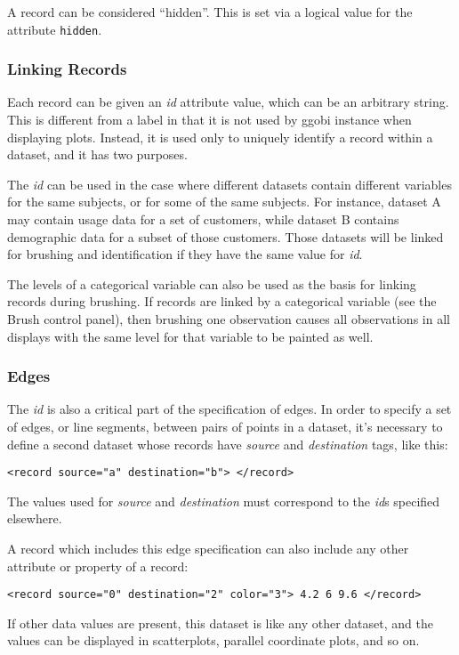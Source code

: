 \documentclass{article}
\def\XMLAttribute#1{\textsl{#1}}
\begin{document}
A record can be considered ``hidden''.  This is set via a logical
value for the attribute \texttt{hidden}.

\subsubsection{Linking Records}
\label{LinkingRecords}

Each record can be given an \XMLAttribute{id} attribute value, which
can be an arbitrary string.  This
is different from a label in that it is not used by ggobi instance
when displaying plots.  Instead, it is used only to uniquely identify
a record within a dataset, and it has two purposes.

The \XMLAttribute{id} can be used in the case where different
datasets contain different variables for the same subjects, or
for some of the same subjects.  For instance, dataset A may contain
usage data for a set of customers, while dataset B contains
demographic data for a subset of those customers.  Those datasets
will be linked for brushing and identification if they have the
same value for \XMLAttribute{id}.

The levels of a categorical variable can also be used as the basis for
linking records during brushing.  If records are linked by a
categorical variable (see the Brush control panel), then brushing one
observation causes all observations in all displays with the same
level for that variable to be painted as well.

\subsubsection{Edges}
\label{Edges}

The \XMLAttribute{id} is also a critical part of the specification
of edges.  In order to specify a set of edges, or line segments,
between pairs of points in a dataset, it's necessary to define
a second dataset whose records have \XMLAttribute{source}
and \XMLAttribute{destination} tags, like this:

\begin{verbatim}
<record source="a" destination="b"> </record>
\end{verbatim}
% 
The values used for \XMLAttribute{source} and \XMLAttribute{destination}
must correspond to the \XMLAttribute{id}s specified elsewhere.

A record which includes this edge specification can also include
any other attribute or property of a record:
\begin{verbatim}
<record source="0" destination="2" color="3"> 4.2 6 9.6 </record>
\end{verbatim}
%
If other data values are present, this dataset is like any other
dataset, and the values can be displayed in scatterplots, 
parallel coordinate plots, and so on.
\end{document}
